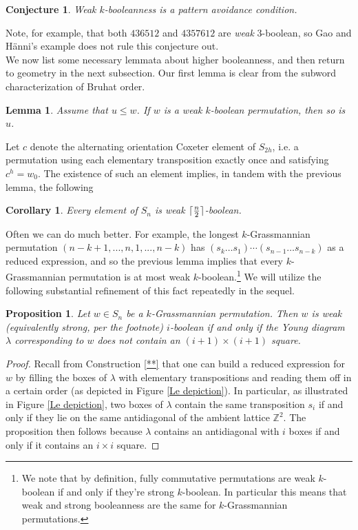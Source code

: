 \documentclass[11pt]{amsart}
\DeclarePairedDelimiter{\ceil}{\lceil}{\rceil}
\newtheorem{cor}[thm]{Corollary}
\newtheorem{prop}[thm]{Proposition}
\newtheorem{lem}[thm]{Lemma}
\newtheorem{conj}[thm]{Conjecture}
\theoremstyle{definition}
\theoremstyle{remark}
\numberwithin{equation}{section}
\begin{document}
    \begin{conj}
        Weak $k$-booleanness is a pattern avoidance condition.
    \end{conj}
    
    Note, for example, that both $436512$ and $4357612$ are \textit{weak} $3$-boolean, so Gao and H\"anni's example does not rule this conjecture out.\\

We now list some necessary lemmata about higher booleanness, and then return to geometry in the next subsection. Our first lemma is clear from the subword characterization of Bruhat order.

\begin{lem}
    Assume that $u \leq w$. If $w$ is a weak $k$-boolean permutation, then so is $u$.
\end{lem}

Let $c$ denote the alternating orientation Coxeter element of $S_{2h}$, i.e. a permutation using each elementary transposition exactly once and satisfying $c^h = w_0$. The existence of such an element implies, in tandem with the previous lemma, the following

\begin{cor}
    Every element of $S_n$ is weak $\ceil{\frac{n}{2}}$-boolean.
\end{cor}

Often we can do much better. For example, the longest $k$-Grassmannian permutation $(n - k + 1, ..., n, 1, ..., n - k)$ has $(s_k \dots s_1)\cdots(s_{n-1}\dots s_{n-k})$ as a reduced expression, and so the previous lemma implies that every $k$-Grassmannian permutation is at most weak $k$-boolean.\footnote{We note that by definition, fully commutative permutations are weak $k$-boolean if and only if they're strong $k$-boolean. In particular this means that weak and strong booleanness are the same for $k$-Grassmannian permutations.} We will utilize the following substantial refinement of this fact repeatedly in the sequel.

\begin{prop}
    Let $w \in S_n$ be a $k$-Grassmannian permutation. Then $w$ is weak (equivalently strong, per the footnote) $i$-boolean if and only if the Young diagram $\lambda$ corresponding to $w$ does not contain an $(i + 1) \times (i + 1)$ square.
\end{prop}

\begin{proof}
    Recall from Construction \ref{**} that one can build a reduced expression for $w$ by filling the boxes of $\lambda$ with elementary transpositions and reading them off in a certain order (as depicted in Figure \ref{Le depiction}). In particular, as illustrated in Figure \ref{Le depiction}, two boxes of $\lambda$ contain the same transposition $s_i$ if and only if they lie on the same antidiagonal of the ambient lattice $\mathbb{Z}^2$. The proposition then follows because $\lambda$ contains an antidiagonal with $i$ boxes if and only if it contains an $i\times i$ square. \end{proof}
\end{document}

